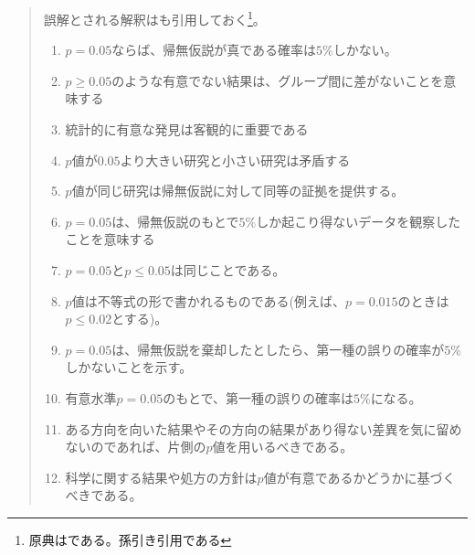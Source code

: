 \documentclass[a4paper,11pt,dvipdfmx]{jsarticle}
\begin{document}
\begin{mybox}
\begin{quote}
    誤解とされる解釈はも引用しておく\cite{idiot_statistics2014}\footnote{原典は\cite{GOODMAN2008135}である。孫引き引用である}。
    \begin{enumerate}
        \item $p=0.05$ならば、帰無仮説が真である確率は$5\%$しかない。
        \item $p\geq 0.05$のような有意でない結果は、グループ間に差がないことを意味する
        \item 統計的に有意な発見は客観的に重要である
        \item $p$値が$0.05$より大きい研究と小さい研究は矛盾する
        \item $p$値が同じ研究は帰無仮説に対して同等の証拠を提供する。
        \item $p=0.05$は、帰無仮説のもとで$5\%$しか起こり得ないデータを観察したことを意味する
        \item $p=0.05$と$p\leq 0.05$は同じことである。
        \item $p$値は不等式の形で書かれるものである(例えば、$p=0.015$のときは$p\leq 0.02$とする)。
        \item $p=0.05$は、帰無仮説を棄却したとしたら、第一種の誤りの確率が$5\%$しかないことを示す。
        \item 有意水準$p=0.05$のもとで、第一種の誤りの確率は$5\%$になる。
        \item ある方向を向いた結果やその方向の結果があり得ない差異を気に留めないのであれば、片側の$p$値を用いるべきである。
        \item 科学に関する結果や処方の方針は$p$値が有意であるかどうかに基づくべきである。
    \end{enumerate}

    \end{quote}
\end{mybox}
\end{document}
